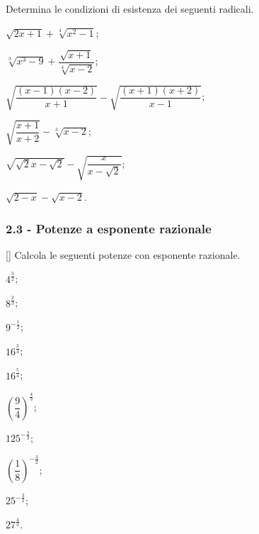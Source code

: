 \begin{esercizio}[\Ast]
	\label{ese:2.17}
	Determina le condizioni di esistenza dei seguenti radicali.
	\begin{multicols}{2}
		\begin{enumeratea}
			\item $\sqrt{2x+1}+\sqrt[4]{x^2-1}$;
			\item $\sqrt[3]{x^3-9}+\dfrac{\sqrt{x+1}}{\sqrt[4]{x-2}}$;
			\item $\sqrt{\dfrac{(x-1)(x-2)}{x+1}}-\sqrt{\dfrac{(x+1)(x+2)}{x-1}}$;
			\item $\sqrt{\dfrac{x+1}{x+2}}-\sqrt[3]{x-2}$;
			\item $\sqrt{\sqrt{2}x-\sqrt{2}}-\sqrt{\dfrac{x}{x-\sqrt{2}}}$;
			\item $\sqrt{2-x}-\sqrt{x-2}$.
		\end{enumeratea}
	\end{multicols}
\end{esercizio}

\subsubsection*{2.3 - Potenze a esponente razionale}
\begin{esercizio}
 \label{ese:2.18}[\Ast]
Calcola le seguenti potenze con esponente razionale.
 \begin{multicols}{3}
 \begin{enumeratea}
 \item $4^{\frac 3 2}$;
 \item $8^{\frac 2 3}$;
 \item $9^{-\frac 1 2}$;
 \item $16^{\frac 3 4}$;
 \item $16^{\frac 5 4}$;
 \item $\left(\dfrac 9 4\right)^{\frac 4 3}$;
 \item $125^{-\frac 2 3}$;
 \item $\left(\dfrac 1 8\right)^{-\frac 3 2}$;
 \item $25^{-\frac 3 2}$;
 \item $27^{\frac 4 3}$.
 \end{enumeratea}
 \end{multicols}
\end{esercizio}

